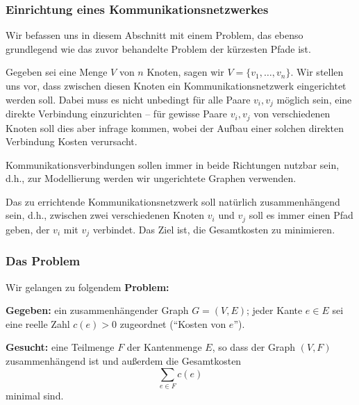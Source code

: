 \documentclass[smaller]{beamer}
\begin{document}
\begin{frame}
\frametitle{Einrichtung eines Kommunikationsnetzwerkes}
Wir befassen uns in diesem Abschnitt mit einem Problem, das ebenso grundlegend wie das zuvor behandelte Problem der kürzesten Pfade ist. \\ \vspace*{0.2cm}

Gegeben sei eine Menge $V$ von $n$ Knoten, sagen wir $V = \bigl\{ v_1, \ldots, v_n \bigr\}$. Wir stellen uns vor, dass zwischen diesen Knoten ein \alert{Kommunikationsnetzwerk} eingerichtet werden soll. Dabei muss es nicht unbedingt für alle Paare $v_i,v_j$ möglich sein, eine direkte Verbindung einzurichten -- für gewisse Paare $v_i,v_j$ von verschiedenen Knoten soll dies aber infrage kommen, wobei der Aufbau einer solchen direkten Verbindung \alert{Kosten} verursacht. \\ \vspace*{0.2cm}

Kommunikationsverbindungen sollen immer in beide Richtungen nutzbar sein, d.h., zur Modellierung werden wir \alert{ungerichtete Graphen} verwenden. \\ \vspace*{0.2cm}

Das zu errichtende Kommunikationsnetzwerk soll natürlich \alert{zusammenhängend} sein, d.h., zwischen zwei verschiedenen Knoten $v_i$ und $v_j$ soll es immer einen Pfad geben, der $v_i$ mit $v_j$ verbindet. \alert{Das Ziel ist, die Gesamtkosten zu minimieren}.
\end{frame}

\begin{frame}
\frametitle{Das Problem}
Wir gelangen zu folgendem \textbf{Problem:} \\ \vspace*{0.2cm}

\textbf{Gegeben:} ein zusammenhängender Graph $G=(V,E)$; jeder Kante $e \in E$ sei eine reelle Zahl $c(e) > 0$ zugeordnet (\enquote{Kosten von $e$}). \\ \vspace*{0.2cm}

\textbf{Gesucht:} eine Teilmenge $F$ der Kantenmenge $E$, so dass der Graph $(V,F)$ zusammenhängend ist und außerdem die Gesamtkosten
\[
\sum\limits_{e \in F}{c(e)}
\]
minimal sind.
\end{frame}
\end{document}
